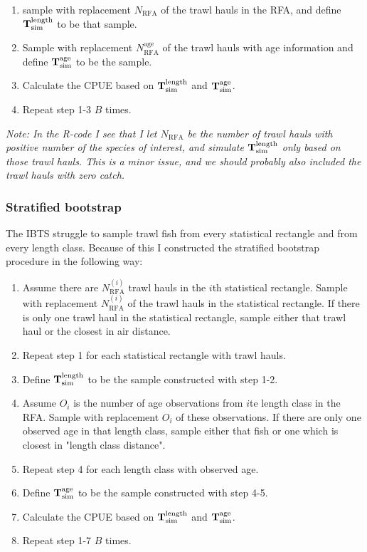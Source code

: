 \documentclass[a4paper 12pt]{article}
\numberwithin{equation}{section}
\begin{document}
\begin{enumerate}
\item sample with replacement $N_{\text{RFA}}$ of the trawl hauls in the RFA, and define ${\bf T}_{\text{sim}}^{\text{length}}$ to be that sample.
\item Sample with replacement $N_{\text{RFA}}^{\text{age}}$ of the trawl hauls with age information and define ${\bf T}_{\text{sim}}^{\text{age}}$ to be the sample.
\item Calculate the CPUE based on ${\bf T }_{\text{sim}}^{\text{length}}$ and ${\bf T}_{\text{sim}}^{\text{age}}$. 
\item Repeat step 1-3 $B$ times.
\end{enumerate}  

\textit{Note: In the R-code I see that I let $N_{\text{RFA}}$ be the number of trawl hauls with positive number of the species of interest, and simulate ${\bf T}_{\text{sim}}^{\text{length}}$ only based on those trawl hauls. This is a minor issue, and we should probably also included the trawl hauls with zero catch.}



\subsubsection{Stratified bootstrap}
\label{stratboot}
The IBTS struggle to sample trawl fish from every statistical rectangle and from every length class. Because of this I constructed the stratified bootstrap procedure in the following way: 

\begin{enumerate}
\item Assume there are $N_{\text{RFA}}^{(i)}$ trawl hauls in the $i$th statistical rectangle.  Sample with replacement $N_{\text{RFA}}^{(i)}$ of the trawl hauls in the statistical rectangle. If there is only one trawl haul in the statistical rectangle, sample either that trawl haul or the closest in air distance. 
\item Repeat step 1 for each statistical rectangle with trawl hauls. 
\item Define ${\bf T}_{\text{sim}}^{\text{length}}$ to be the sample constructed with step 1-2.
\item Assume $O_i$ is the number of age observations from $i$te length class in the RFA. Sample with replacement $O_i$ of these observations. If there are only one observed age in that length class, sample either that fish or one which is closest in "length class distance".
\item Repeat step 4 for each length class with observed age. 
\item Define ${\bf T}_{\text{sim}}^{\text{age}}$ to be the sample constructed with step 4-5.
\item Calculate the CPUE based on ${\bf T }_{\text{sim}}^{\text{length}}$ and ${\bf T}_{\text{sim}}^{\text{age}}$. 
\item Repeat step 1-7 $B$ times.
\end{enumerate}  
\end{document}
